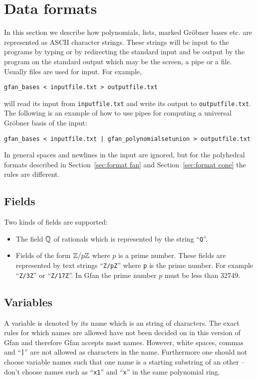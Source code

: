 \section{Data formats}
\label{sec:dataformats}

In this section we describe how polynomials, lists, marked Gr\"obner
bases etc. are represented as ASCII character strings. These strings
will be input to the programs by typing or by redirecting the standard
input and be output by the program on the standard output which may be
the screen, a pipe or a file. Usually files are used for input. For
example,
\begin{verbatim}
gfan_bases < inputfile.txt > outputfile.txt
\end{verbatim}
will read its input from {\tt inputfile.txt} and write its output to
{\tt outputfile.txt}. The following is an example of how to use pipes
for computing a universal Gr\"obner basis of the input:
\begin{verbatim}
gfan_bases < inputfile.txt | gfan_polynomialsetunion > outputfile.txt
\end{verbatim}
In general spaces and newlines in the input are ignored, but for the
polyhedral formats described in Section~\ref{sec:format fan} and
Section~\ref{sec:format cone} the rules are different.

\subsection{Fields}
Two kinds of fields are supported:
\begin{itemize}
\item The field $\mathbb{Q}$ of rationals which is represented by the string ``\texttt{Q}''.
\item Fields of the form $\mathbb{Z}/p\mathbb{Z}$ where $p$ is a prime number. These
fields are represented by text strings ``\texttt{Z/pZ}'' where \texttt{p}  is the
prime number. For example ``\texttt{Z/3Z}'' or ``\texttt{Z/17Z}''. In Gfan the
prime number $p$ must be less than $32749$.
\end{itemize}
\subsection{Variables}
A variable is denoted by its name which is an string of
characters. The exact rules for which names are allowed have not been
decided on in this version of Gfan and therefore Gfan accepts most
names. However, white spaces, commas and ``\texttt{]}'' are not allowed
as characters in the name. Furthermore one should not choose variable
names such that one name is a starting substring of an other -- don't
choose names such as ``\texttt{x1}'' and ``\texttt{x}''
in the same polynomial ring.

